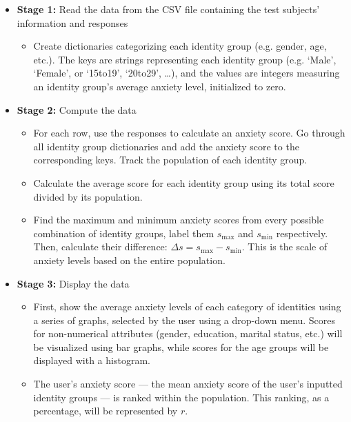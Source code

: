 \documentclass[fontsize=11pt]{article}
\begin{document}
    \begin{itemize}
        \item \textbf{Stage 1:} Read the data from the CSV file containing the test subjects’ information and responses

        \begin{itemize}
            \item Create dictionaries categorizing each identity group (e.g. gender, age, etc.). The keys are strings representing each identity group (e.g. `Male’, `Female’, or `15to19’, `20to29’, \dots), and the values are integers measuring an identity group’s average anxiety level, initialized to zero.
        \end{itemize}

        \item \textbf{Stage 2:} Compute the data

        \begin{itemize}
            \item For each row, use the responses to calculate an anxiety score. Go through all identity group dictionaries and add the anxiety score to the corresponding keys. Track the population of each identity group.

            \item Calculate the average score for each identity group using its total score divided by its population.

            \item Find the maximum and minimum anxiety scores from every possible combination of identity groups, label them $s_{\mathrm{max}}$ and $s_{\mathrm{min}}$ respectively. Then, calculate their difference: $\Delta s = s_{\mathrm{max}} - s_{\mathrm{min}}$. This is the scale of anxiety levels based on the entire population.
        \end{itemize}

        \item \textbf{Stage 3:} Display the data

        \begin{itemize}
            \item First, show the average anxiety levels of each category of identities using a series of graphs, selected by the user using a drop-down menu. Scores for non-numerical attributes (gender, education, marital status, etc.) will be visualized using bar graphs, while scores for the age groups will be displayed with a histogram.

            \item The user’s anxiety score — the mean anxiety score of the user’s inputted identity groups — is ranked within the population. This ranking, as a percentage, will be represented by $r$.


\end{itemize}
\end{itemize}
\end{document}
